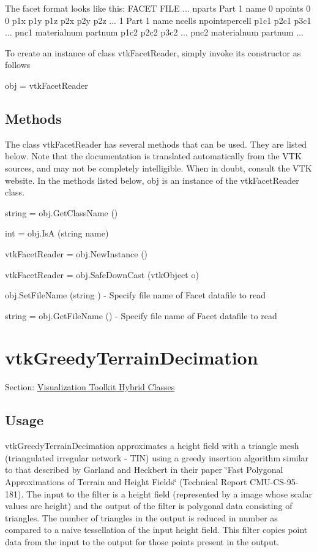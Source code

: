 The facet format looks like this\-: F\-A\-C\-E\-T F\-I\-L\-E ... nparts Part 1 name 0 npoints 0 0 p1x p1y p1z p2x p2y p2z ... 1 Part 1 name ncells npointspercell p1c1 p2c1 p3c1 ... pnc1 materialnum partnum p1c2 p2c2 p3c2 ... pnc2 materialnum partnum ...

To create an instance of class vtk\-Facet\-Reader, simply invoke its constructor as follows \begin{DoxyVerb}  obj = vtkFacetReader
\end{DoxyVerb}
 \hypertarget{vtkwidgets_vtkxyplotwidget_Methods}{}\subsection{Methods}\label{vtkwidgets_vtkxyplotwidget_Methods}
The class vtk\-Facet\-Reader has several methods that can be used. They are listed below. Note that the documentation is translated automatically from the V\-T\-K sources, and may not be completely intelligible. When in doubt, consult the V\-T\-K website. In the methods listed below, {\ttfamily obj} is an instance of the vtk\-Facet\-Reader class. 
\begin{DoxyItemize}
\item {\ttfamily string = obj.\-Get\-Class\-Name ()}  
\item {\ttfamily int = obj.\-Is\-A (string name)}  
\item {\ttfamily vtk\-Facet\-Reader = obj.\-New\-Instance ()}  
\item {\ttfamily vtk\-Facet\-Reader = obj.\-Safe\-Down\-Cast (vtk\-Object o)}  
\item {\ttfamily obj.\-Set\-File\-Name (string )} -\/ Specify file name of Facet datafile to read  
\item {\ttfamily string = obj.\-Get\-File\-Name ()} -\/ Specify file name of Facet datafile to read  
\end{DoxyItemize}\hypertarget{vtkhybrid_vtkgreedyterraindecimation}{}\section{vtk\-Greedy\-Terrain\-Decimation}\label{vtkhybrid_vtkgreedyterraindecimation}
Section\-: \hyperlink{sec_vtkhybrid}{Visualization Toolkit Hybrid Classes} \hypertarget{vtkwidgets_vtkxyplotwidget_Usage}{}\subsection{Usage}\label{vtkwidgets_vtkxyplotwidget_Usage}
vtk\-Greedy\-Terrain\-Decimation approximates a height field with a triangle mesh (triangulated irregular network -\/ T\-I\-N) using a greedy insertion algorithm similar to that described by Garland and Heckbert in their paper \char`\"{}\-Fast Polygonal Approximations of Terrain and Height Fields\char`\"{} (Technical Report C\-M\-U-\/\-C\-S-\/95-\/181). The input to the filter is a height field (represented by a image whose scalar values are height) and the output of the filter is polygonal data consisting of triangles. The number of triangles in the output is reduced in number as compared to a naive tessellation of the input height field. This filter copies point data from the input to the output for those points present in the output.

